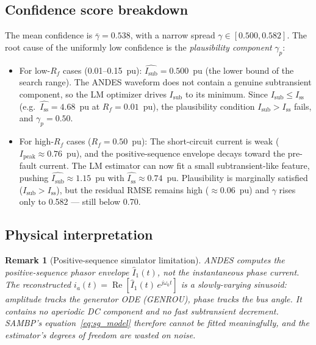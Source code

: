 \documentclass[11pt,a4paper]{article}
\newtheorem{remark}{Remark}
\newcommand{\Isub}{I_{\text{sub}}}
\newcommand{\Iss}{I_{\text{ss}}}
\newcommand{\gconf}{\gamma}
\begin{document}
\subsection{Confidence score breakdown}

The mean confidence is $\bar{\gconf} = 0.538$, with a narrow spread
$\gconf \in [0.500, 0.582]$.  The root cause of the uniformly low
confidence is the \emph{plausibility component} $\gconf_p$:

\begin{itemize}
  \item For low-$R_f$ cases (0.01--0.15~pu): $\hat{\Isub} = 0.500$~pu
        (the lower bound of the search range).  The ANDES waveform does not
        contain a genuine subtransient component, so the LM optimizer drives
        $\Isub$ to its minimum.  Since $\Isub \leq \Iss$ (e.g.\
        $\hat{\Iss} = 4.68$~pu at $R_f = 0.01$~pu), the plausibility
        condition $\Isub > \Iss$ fails, and $\gconf_p = 0.50$.

  \item For high-$R_f$ cases ($R_f = 0.50$~pu): The short-circuit current
        is weak ($I_\text{peak} \approx 0.76$~pu), and the positive-sequence
        envelope decays toward the pre-fault current.  The LM estimator can
        now fit a small subtransient-like feature, pushing
        $\hat{\Isub} \approx 1.15$~pu with $\hat{\Iss} \approx 0.74$~pu.
        Plausibility is marginally satisfied ($\Isub > \Iss$), but the
        residual RMSE remains high ($\approx 0.06$~pu) and
        $\gconf$ rises only to 0.582 — still below 0.70.
\end{itemize}

\subsection{Physical interpretation}

\begin{remark}[Positive-sequence simulator limitation]
ANDES computes the positive-sequence phasor envelope $\hat{I}_1(t)$, not
the instantaneous phase current.  The reconstructed
$i_a(t) = \operatorname{Re}[\hat{I}_1(t)\,e^{j\omega_0 t}]$ is a
\emph{slowly-varying sinusoid}: amplitude tracks the generator ODE
(GENROU), phase tracks the bus angle.  It contains no aperiodic DC
component and no fast subtransient decrement.  SAMBP's
equation~\eqref{eq:sg_model} therefore cannot be fitted meaningfully,
and the estimator's degrees of freedom are wasted on noise.
\end{remark}
\end{document}
